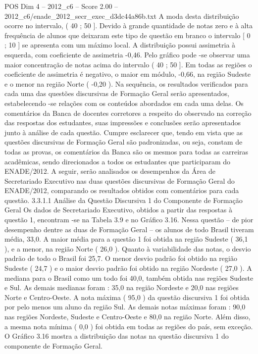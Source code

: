 \begin{textsample}{POS Dim 4 – 2012\_c6 – Score 2.00 – 2012\_c6/enade\_2012\_secr\_exec\_d3dc44a86b.txt}
A moda desta distribuição ocorre no intervalo, ( 40 ; 50 ].
Devido à grande quantidade de notas zero e à alta frequência de alunos que deixaram este tipo de questão em branco o intervalo [ 0 ; 10 ] se apresenta com um máximo local.
A distribuição possui assimetria à esquerda, com coeficiente de assimetria -0,46.
Pelo gráfico pode -se observar uma maior concentração de notas acima do intervalo ( 40 ; 50 ].
Em todas as regiões o coeficiente de assimetria é negativo, o maior em módulo, -0,66, na região Sudeste e o menor na região Norte ( -0,20 ).
Na sequência, os resultados verificados para cada uma das questões discursivas de Formação Geral serão apresentados, estabelecendo -se relações com os conteúdos abordados em cada uma delas.
Os comentários da Banca de docentes corretores a respeito do observado na correção das respostas dos estudantes, suas impressões e conclusões serão apresentados junto à análise de cada questão.
Cumpre esclarecer que, tendo em vista que as questões discursivas de Formação Geral são padronizadas, ou seja, constam de todas as provas, os comentários da Banca são os mesmos para todas as carreiras acadêmicas, sendo direcionados a todos os estudantes que participaram do ENADE/2012.
A seguir, serão analisados os desempenhos da Área de Secretariado Executivo nas duas questões discursivas de Formação Geral do ENADE/2012, comparando os resultados obtidos com comentários para cada questão. 3.3.1.1 Análise da Questão Discursiva 1 do Componente de Formação Geral Os dados de Secretariado Executivo, obtidos a partir das respostas à questão 1, encontram -se na Tabela 3.9 e no Gráfico 3.16.
Nessa questão – de pior desempenho dentre as duas de Formação Geral – os alunos de todo Brasil tiveram média, 33,0.
A maior média para a questão 1 foi obtida na região Sudeste ( 36,1 ), e a menor, na região Norte ( 26,0 ).
Quanto à variabilidade das notas, o desvio padrão de todo o Brasil foi 25,7.
O menor desvio padrão foi obtido na região Sudeste ( 24,7 ) e o maior desvio padrão foi obtido na região Nordeste ( 27,0 ).
A mediana para o Brasil como um todo foi 40,0, também obtida nas regiões Sudeste e Sul.
As demais medianas foram : 35,0 na região Nordeste e 20,0 nas regiões Norte e Centro-Oeste.
A nota máxima ( 95,0 ) da questão discursiva 1 foi obtida por pelo menos um aluno da região Sul.
As demais notas máximas foram : 90,0 nas regiões Nordeste, Sudeste e Centro-Oeste e 80,0 na região Norte.
Além disso, a mesma nota mínima ( 0,0 ) foi obtida em todas as regiões do país, sem exceção.
O Gráfico 3.16 mostra a distribuição das notas na questão discursiva 1 do componente de Formação Geral.

\end{textsample}
